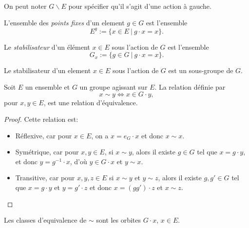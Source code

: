 \begin{notn}
	On peut noter $G \backslash E$ pour spécifier qu'il s'agit d'une action à gauche.
\end{notn}

\begin{defn}
	L'ensemble des \emph{points fixes} d'un element $g \in G$ est l'ensemble
	\begin{equation*}
		E^g := \{x \in E\ |\ g \cdot x = x\}.
	\end{equation*}
\end{defn}

\begin{defn}
	Le \emph{stabilisateur} d'un élément $x \in E$ sous l'action de $G$ est l'ensemble
	\begin{equation*}
		G_x := \{g \in G\ |\ g \cdot x = x\}.
	\end{equation*}
\end{defn}

\begin{rmq}
	Le stabilisateur d'un element $x \in E$ sous l'action de $G$ est un sous-groupe de $G$.	
\end{rmq}

\begin{thm}
	Soit $E$ un ensemble et $G$ un groupe agissant sur $E$. La relation définie par
	\begin{equation*}
		x \sim y \iff x \in G \cdot y,
	\end{equation*}
	pour $x, y \in E$, est une relation d'équivalence.
\end{thm}

\begin{proof}
	Cette relation est:
	\begin{itemize}
		\item Réflexive, car pour $x \in E$, on a $x = e_G \cdot x$ et donc $x \sim x$.
		\item Symétrique, car pour $x, y \in E$, si $x \sim y$,
			alors il existe $g \in G$ tel que $x = g \cdot y$, et donc $y = g^{-1} \cdot x$,
			d'où $y \in G \cdot x$ et $y \sim x$.
		\item Transitive, car pour $x, y, z \in E$ si $x \sim y$ et $y \sim z$,
			alors il existe $g,g' \in G$ tel que $x = g \cdot y$ et
			$y = g' \cdot z$ et donc $x = (g g') \cdot z$ et $x \sim z$.
	\end{itemize}
\end{proof}

\begin{rmq}
	Les classes d'equivalence de $\sim$ sont les orbites $G \cdot x$, $x \in E$.
\end{rmq}

